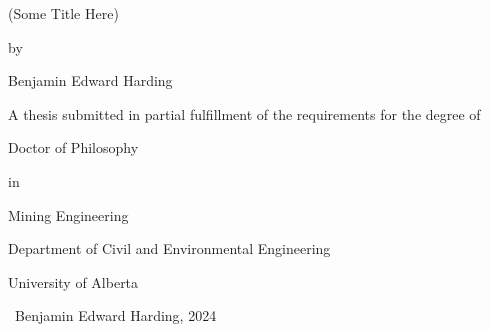 \begin{SingleSpace}

    \begin{center}
        \thispagestyle{empty}

        \vspace*{4\baselineskip}
        (Some Title Here)
        \vspace*{1\baselineskip}

        by
        \vspace*{1\baselineskip}

        Benjamin Edward Harding
        \vspace*{6\baselineskip}

        A thesis submitted in partial fulfillment of the requirements for the degree of
        \vspace*{2\baselineskip}

        Doctor of Philosophy
        \vspace*{1\baselineskip}

        in
        \vspace*{1\baselineskip}

        Mining Engineering
        \vspace*{5\baselineskip}

        Department of Civil and Environmental Engineering

        University of Alberta
        \vspace*{10\baselineskip}

        \textcopyright\ Benjamin Edward Harding, 2024

    \end{center}

\end{SingleSpace}
